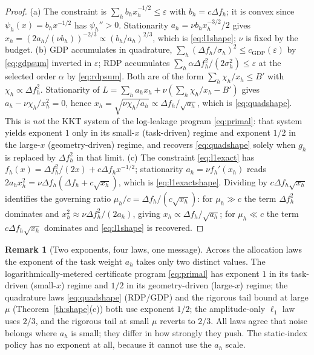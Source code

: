 \documentclass[10pt,twocolumn,letterpaper]{article}
\theoremstyle{plain}
\theoremstyle{definition}
\newtheorem{remark}{Remark}
\begin{document}
\begin{proof}
(a) The constraint is $\sum_hb_hx_h^{-1/2}\le\varepsilon$ with
$b_h=c\Delta f_h$; it is convex since $\psi_h(x)=b_hx^{-1/2}$ has
$\psi_h''>0$. Stationarity $a_h=\nu b_hx_h^{-3/2}/2$ gives
$x_h=(2a_h/(\nu b_h))^{-2/3}\propto(b_h/a_h)^{2/3}$, which is
\eqref{eq:l1shape}; $\nu$ is fixed by the budget.
(b) GDP accumulates in quadrature,
$\sum_h(\Delta f_h/\sigma_h)^{2}\le c_{\mathrm{GDP}}(\varepsilon)$ by
\eqref{eq:gdpsum} inverted in $\varepsilon$; RDP accumulates
$\sum_h\alpha\Delta f_h^2/(2\sigma_h^2)\le\varepsilon$ at the selected order
$\alpha$ by \eqref{eq:rdpsum}. Both are of the form $\sum_h\chi_h/x_h\le B'$
with $\chi_h\propto\Delta f_h^2$. Stationarity of
$L=\sum_ha_hx_h+\nu(\sum_h\chi_h/x_h-B')$ gives
$a_h-\nu\chi_h/x_h^2=0$, hence $x_h=\sqrt{\nu\chi_h/a_h}\propto\Delta f_h/\sqrt{a_h}$,
which is \eqref{eq:quadshape}. This is \emph{not} the KKT system of the log-leakage
program \eqref{eq:primal}: that system yields exponent $1$ only in its small-$x$
(task-driven) regime and exponent $1/2$ in the large-$x$ (geometry-driven)
regime, and recovers \eqref{eq:quadshape} solely when $g_h$ is replaced by
$\Delta f_h^2$ in that limit.
(c) The constraint \eqref{eq:l1exact} has
$f_h(x)=\Delta f_h^2/(2x)+c\Delta f_hx^{-1/2}$; stationarity
$a_h=\nu f_h'(x_h)$ reads
$2a_hx_h^2=\nu\Delta f_h(\Delta f_h+c\sqrt{x_h})$, which is
\eqref{eq:l1exactshape}. Dividing by $c\Delta f_h\sqrt{x_h}$ identifies the
governing ratio $\mu_h/c=\Delta f_h/(c\sqrt{x_h})$: for $\mu_h\gg c$ the term
$\Delta f_h^2$ dominates and $x_h^2\approx\nu\Delta f_h^2/(2a_h)$, giving
$x_h\propto\Delta f_h/\sqrt{a_h}$; for $\mu_h\ll c$ the term
$c\Delta f_h\sqrt{x_h}$ dominates and \eqref{eq:l1shape} is recovered.
\end{proof}

\begin{remark}[Two exponents, four laws, one message]
\label{rm:exponents}
Across the allocation laws the exponent of the task weight $a_h$ takes only two
distinct values. The logarithmically-metered certificate program
\eqref{eq:primal} has exponent $1$ in its task-driven (small-$x$) regime and
$1/2$ in its geometry-driven (large-$x$) regime; the quadrature laws
\eqref{eq:quadshape} (RDP/GDP) and the rigorous tail bound at large $\mu$
(Theorem~\ref{th:shape}(c)) both use exponent $1/2$; the amplitude-only
$\ell_1$ law uses $2/3$, and the rigorous tail at small $\mu$ reverts to $2/3$.
All laws agree that noise belongs where $a_h$ is small; they differ in how
strongly they push. The static-index policy has no exponent at all, because it
cannot use the $a_h$ scale.
\end{remark}
\end{document}
